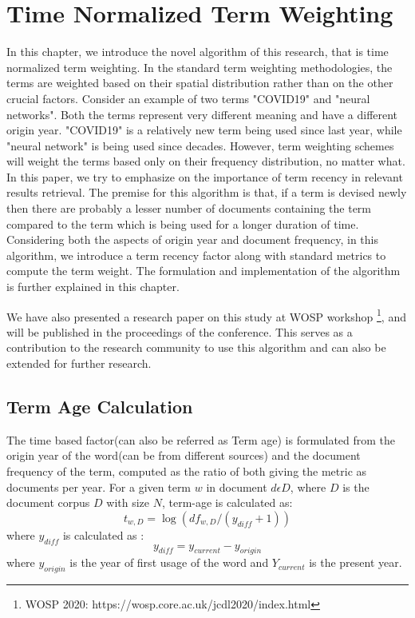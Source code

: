 \chapter{Time Normalized Term Weighting}
In this chapter, we introduce the novel algorithm of this research, that is time normalized term weighting. In the standard term weighting methodologies, the terms are weighted based on their spatial distribution rather than on the other crucial factors. Consider an example of two terms "COVID19" and "neural networks". Both the terms represent very different meaning and have a different origin year. "COVID19" is a relatively new term being used since last year, while "neural network" is being used since decades. However, term weighting schemes will weight the terms based only on their frequency distribution, no matter what. In this paper, we try to emphasize on the importance of term recency in relevant results retrieval. The premise for this algorithm is that, if a term is devised newly then there are probably a lesser number of documents containing the term compared to the term which is being used for a longer duration of time. Considering both the aspects of origin year and document frequency, in this algorithm, we introduce a term recency factor along with standard metrics to compute the term weight. The formulation and implementation of the algorithm is further explained in this chapter.

We have also presented a research paper on this study at WOSP workshop \footnote{WOSP 2020: https://wosp.core.ac.uk/jcdl2020/index.html}, and will be published in the proceedings of the conference. This serves as a contribution to the research community to use this algorithm and can also be extended for further research.

\section{Term Age Calculation}
The time based factor(can also be referred as Term age) is formulated from the origin year of the word(can be from different sources) and the document frequency of the term, computed as the ratio of both giving the metric as documents per year. For a given term $w$ in document $d  \epsilon D$, where $D$  is the document corpus $D$ with size $N$, term-age is calculated as:
\begin{equation}
    t_{w,D}=\log(df_{w,D}/(y_{diff}+1))
\end{equation}
where $y_{diff}$ is calculated as :
\begin{equation}
    y_{diff} = y_{current} - y_{origin}
\end{equation}
where $y_{origin}$ is the year of first usage of the word and $Y_{current}$ is the present year.

